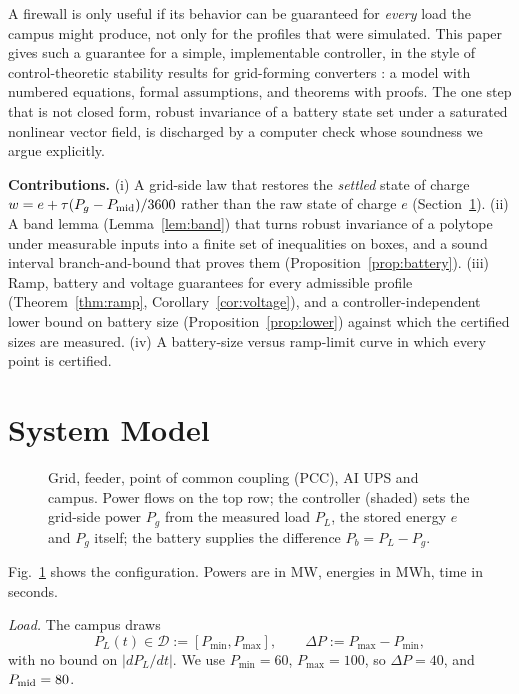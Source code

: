 \documentclass[journal]{IEEEtran}
\theoremstyle{remark}
\newcommand{\Pmin}{P_{\min}}
\newcommand{\Pmax}{P_{\max}}
\newcommand{\D}{\mathcal{D}}
\begin{document}
A firewall is only useful if its behavior can be guaranteed for \emph{every} load the campus might produce, not only
for the profiles that were simulated. This paper gives such a guarantee for a simple, implementable controller, in the
style of control-theoretic stability results for grid-forming converters \cite{tayyebi2023}: a model with numbered
equations, formal assumptions, and theorems with proofs. The one step that is not closed form, robust invariance of a
battery state set under a saturated nonlinear vector field, is discharged by a computer check whose soundness we argue
explicitly.

\textbf{Contributions.}
(i) A grid-side law that restores the \emph{settled} state of charge $w=e+\tau(P_g-P_{\rm mid})/3600$ rather than the
raw state of charge $e$ (Section~\ref{sec:model}).
(ii) A band lemma (Lemma~\ref{lem:band}) that turns robust invariance of a polytope under measurable inputs into a
finite set of inequalities on boxes, and a sound interval branch-and-bound that proves them
(Proposition~\ref{prop:battery}).
(iii) Ramp, battery and voltage guarantees for every admissible profile (Theorem~\ref{thm:ramp},
Corollary~\ref{cor:voltage}), and a controller-independent lower bound on battery size
(Proposition~\ref{prop:lower}) against which the certified sizes are measured.
(iv) A battery-size versus ramp-limit curve in which every point is certified.

\section{System Model}\label{sec:model}
\begin{figure}[t]
\centering
\resizebox{\columnwidth}{!}{}
\caption{Grid, feeder, point of common coupling (PCC), AI UPS and campus. Power flows on the top row; the
controller (shaded) sets the grid-side power $P_g$ from the measured load $P_L$, the stored energy $e$ and $P_g$
itself; the battery supplies the difference $P_b=P_L-P_g$.}
\label{fig:block}
\end{figure}

Fig.~\ref{fig:block} shows the configuration. Powers are in MW, energies in MWh, time in seconds.

\emph{Load.} The campus draws
\begin{equation}\label{eq:load}
P_L(t)\in\D:=[\Pmin,\Pmax],\qquad \Delta P:=\Pmax-\Pmin,
\end{equation}
with no bound on $|dP_L/dt|$. We use $\Pmin=60$, $\Pmax=100$, so $\Delta P=40$, and $P_{\rm mid}=80$.
\end{document}
